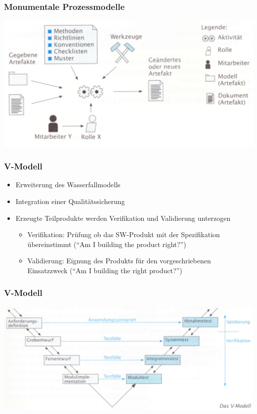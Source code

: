 \begin{frame}
\frametitle{Monumentale Prozessmodelle}
	\center\includegraphics[width=1\textwidth,
			keepaspectratio=true]{bilder/prozessmodell.png}
\end{frame}

\begin{frame}
\frametitle{V-Modell}
	\begin{itemize}
		\item Erweiterung des Wasserfallmodells
		\item Integration einer Qualitätssicherung
		\item Erzeugte Teilprodukte werden Verifikation und Validierung unterzogen
		\begin{itemize}
			\item Verifikation: Prüfung ob das SW-Produkt mit der Spezifikation
			übereinstimmt (``Am I building the product right?'')
			\item Validierung: Eignung des Produkts für den vorgeschriebenen
			Einsatzzweck (``Am I building the right product?'')
		\end{itemize}
	\end{itemize}
\end{frame}

\begin{frame}
\frametitle{V-Modell}
	\center\includegraphics[width=1\textwidth,
			keepaspectratio=true]{bilder/vmodell.png}
\end{frame}

